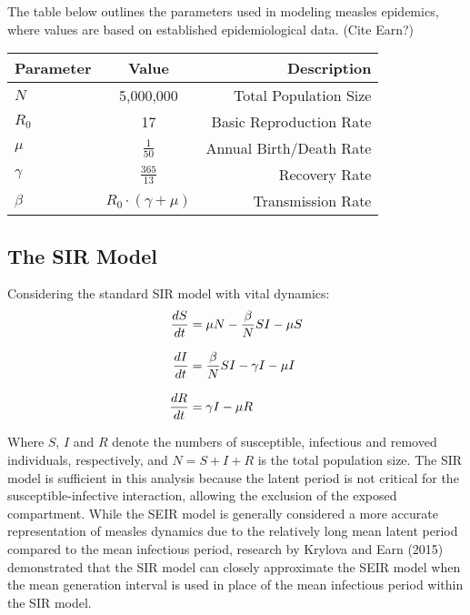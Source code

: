 \documentclass[12pt]{article}
\begin{document}
\bigskip
\indent
The table below outlines the parameters used in modeling measles epidemics, where values are based on established epidemiological data. (Cite Earn?)
\begin{table}[h!]
  \begin{center}
    \renewcommand{\arraystretch}{1.5} 
    \begin{tabular}{l|c|r} 
      \textbf{Parameter} & \textbf{Value} & \textbf{Description}\\
      \hline
      $N$ & 5,000,000 & Total Population Size \\
      $R_0$ & 17 & Basic Reproduction Rate \\
      $\mu$ & $\frac{1}{50}$ & Annual Birth/Death Rate \\
      $\gamma$ & $\frac{365}{13}$ & Recovery Rate \\
      $\beta$ & $R_0 \cdot (\gamma + \mu)$ & Transmission Rate \\ 
    \end{tabular}
    
  \end{center}
\end{table}

\subsection {The SIR Model}
Considering the standard SIR model with vital dynamics: 
    \begin{align}
      \frac{dS}{dt} &= \mu N -\frac{\beta}{N} SI - \mu S\\
      \noalign{\vspace{8pt}}
      \frac{dI}{dt} &= \frac{\beta}{N} SI - \gamma I - \mu I\\
      \noalign{\vspace{8pt}}
      \frac{dR}{dt} &= \gamma I - \mu R
    \end{align}

\indent Where $S$, $I$ and $R$ denote the numbers of susceptible, infectious and removed individuals, respectively, and $N=S+I+R$ is the total population size. The SIR model is sufficient in this analysis because the latent period is not critical for the susceptible-infective interaction, allowing the exclusion of the exposed compartment. While the SEIR model is generally considered a more accurate representation of measles dynamics due to the relatively long mean latent period compared to the mean infectious period, research by Krylova and Earn (2015) demonstrated that the SIR model can closely approximate the SEIR model when the mean generation interval is used in place of the mean infectious period within the SIR model.
\end{document}
